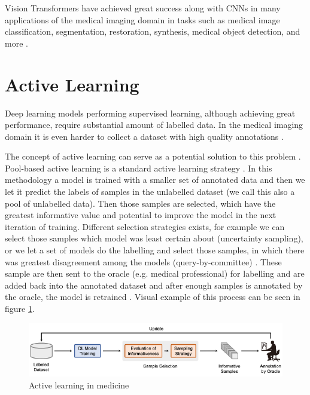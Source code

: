 Vision Transformers have achieved great success along with CNNs in many applications of the medical imaging domain in tasks such as medical image classification, segmentation, restoration, synthesis, medical object detection, and more \cite{Shamshad2023}.

\section{Active Learning}
Deep learning models performing supervised learning, although achieving great performance, require substantial amount of labelled data. In the medical imaging domain it is even harder to collect a dataset with high quality annotations \cite{Nath2021}. 

The concept of active learning can serve as a potential solution to this problem \cite{Nath2021, Wang2023}. Pool-based active learning is a standard active learning strategy \cite{Wang2023}. In this methodology a model is trained with a smaller set of annotated data and then we let it predict the labels of samples in the unlabelled dataset (we call this also a pool of unlabelled data). Then those samples are selected, which have the greatest informative value and potential to improve the model in the next iteration of training. Different selection strategies exists, for example we can select those samples which model was least certain about (uncertainty sampling), or we let a set of models do the labelling and select those samples, in which there was greatest disagreement among the models (query-by-committee) \cite{Wang2023}. These sample are then sent to the oracle (e.g. medical professional) for labelling and are added back into the annotated dataset and after enough samples is annotated by the oracle, the model is retrained \cite{Wang2023}. Visual example of this process can be seen in figure \ref{fig:active-learning}.

\begin{figure}[H]
    \begin{centering}
    \includegraphics[width=14cm]{assets/images/active-learning.png}
    \par\end{centering}
    \caption{Active learning in medicine \cite{Wang2023}}
    \label{fig:active-learning}
\end{figure}

